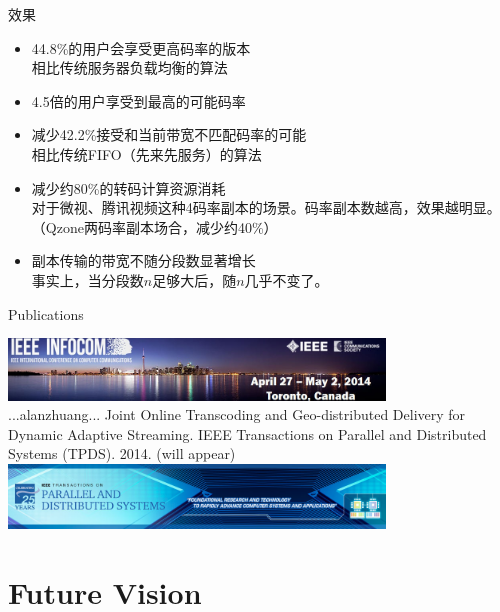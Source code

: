 \documentclass{beamer}
\begin{document}
\begin{frame}{效果}
\begin{itemize}
\item 44.8\%的用户会享受更高码率的版本\\
	相比传统服务器负载均衡的算法
\item 4.5倍的用户享受到最高的可能码率\\
\item 减少42.2\%接受和当前带宽不匹配码率的可能\\
	相比传统FIFO（先来先服务）的算法
\item 减少约80\%的转码计算资源消耗\\
	对于微视、腾讯视频这种4码率副本的场景。码率副本数越高，效果越明显。（Qzone两码率副本场合，减少约40\%）
\item 副本传输的带宽不随分段数显著增长\\
	事实上，当分段数$n$足够大后，随$n$几乎不变了。
\end{itemize}
\end{frame}
\begin{frame}{Publications}
\begin{center}
\includegraphics[width=10cm]{fig/infocom.jpg}\\\pause
...alanzhuang... Joint Online Transcoding and Geo-distributed Delivery for Dynamic Adaptive Streaming. IEEE Transactions on Parallel and Distributed Systems (TPDS). 2014. (will appear)\\\pause
\includegraphics[width=10cm]{fig/tpds_25yr.jpg}\\\pause
\end{center}
\end{frame}

\section{Future Vision}
\end{document}

